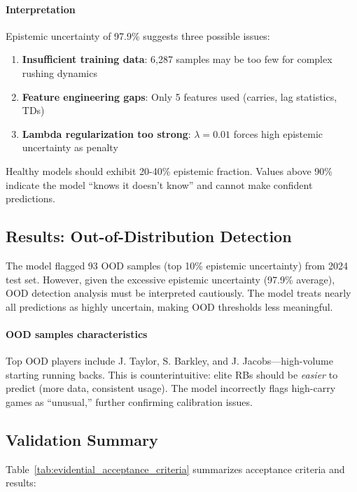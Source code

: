 \paragraph{Interpretation} Epistemic uncertainty of 97.9\% suggests three possible issues:
\begin{enumerate}[nosep]
    \item \textbf{Insufficient training data}: 6,287 samples may be too few for complex rushing dynamics
    \item \textbf{Feature engineering gaps}: Only 5 features used (carries, lag statistics, TDs)
    \item \textbf{Lambda regularization too strong}: $\lambda=0.01$ forces high epistemic uncertainty as penalty
\end{enumerate}

Healthy models should exhibit 20-40\% epistemic fraction. Values above 90\% indicate the model ``knows it doesn't know'' and cannot make confident predictions.

\subsection{Results: Out-of-Distribution Detection}

The model flagged 93 OOD samples (top 10\% epistemic uncertainty) from 2024 test set. However, given the excessive epistemic uncertainty (97.9\% average), OOD detection analysis must be interpreted cautiously. The model treats nearly all predictions as highly uncertain, making OOD thresholds less meaningful.

\paragraph{OOD samples characteristics} Top OOD players include J. Taylor, S. Barkley, and J. Jacobs—high-volume starting running backs. This is counterintuitive: elite RBs should be \textit{easier} to predict (more data, consistent usage). The model incorrectly flags high-carry games as ``unusual,'' further confirming calibration issues.

\subsection{Validation Summary}

Table~\ref{tab:evidential_acceptance_criteria} summarizes acceptance criteria and results:

